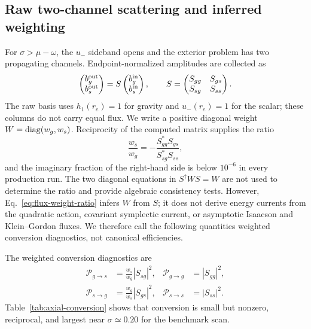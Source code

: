 \subsection{Raw two-channel scattering and inferred weighting}

For $\sigma>\mu-\omega$, the $u_-$ sideband opens and the exterior problem has
two propagating channels.  Endpoint-normalized amplitudes are collected as
\begin{equation}
\begin{pmatrix}b_g^{\rm out}\\ b_s^{\rm out}\end{pmatrix}
=S
\begin{pmatrix}b_g^{\rm in}\\ b_s^{\rm in}\end{pmatrix},
\qquad
S=\begin{pmatrix}S_{gg}&S_{gs}\\S_{sg}&S_{ss}\end{pmatrix}.
\label{eq:raw-scattering-matrix}
\end{equation}
The raw basis uses $h_1(r_e)=1$ for gravity and $u_-(r_e)=1$ for the scalar;
these columns do not carry equal flux.  We write a positive diagonal weight
$W={\rm diag}(w_g,w_s)$.  Reciprocity of the computed matrix supplies the
ratio
\begin{equation}
\frac{w_s}{w_g}=-
\frac{S_{gg}^*S_{gs}}{S_{sg}^*S_{ss}},
\label{eq:flux-weight-ratio}
\end{equation}
and the imaginary fraction of the right-hand side is below $10^{-6}$ in every
production run.  The two diagonal equations in $S^\dagger W S=W$ are not used
to determine the ratio and provide algebraic consistency tests.  However,
Eq.~\eqref{eq:flux-weight-ratio} infers $W$ from $S$; it does not derive energy
currents from the quadratic action, covariant symplectic current, or
asymptotic Isaacson and Klein--Gordon fluxes.  We therefore call the following
quantities weighted conversion diagnostics, not canonical efficiencies.

The weighted conversion diagnostics are
\begin{align}
\mathcal P_{g\to s}&=\frac{w_s}{w_g}|S_{sg}|^2,
&\mathcal P_{g\to g}&=|S_{gg}|^2,\nonumber\\
\mathcal P_{s\to g}&=\frac{w_g}{w_s}|S_{gs}|^2,
&\mathcal P_{s\to s}&=|S_{ss}|^2.
\label{eq:conversion-probabilities}
\end{align}
Table~\ref{tab:axial-conversion} shows that conversion is small but nonzero,
reciprocal, and largest near $\sigma\simeq0.20$ for the benchmark scan.

